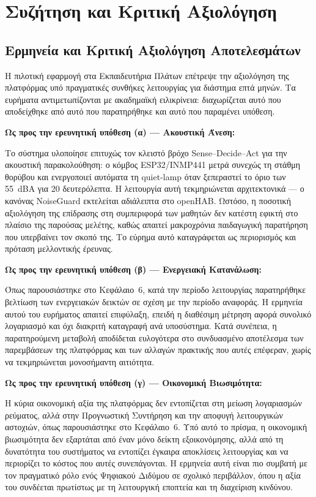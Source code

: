 \chapter{Συζήτηση και Κριτική Αξιολόγηση}

\section{Ερμηνεία και Κριτική Αξιολόγηση Αποτελεσμάτων}
Η πιλοτική εφαρμογή στα Εκπαιδευτήρια Πλάτων επέτρεψε την αξιολόγηση της πλατφόρμας υπό πραγματικές συνθήκες λειτουργίας για διάστημα επτά μηνών. Τα ευρήματα αντιμετωπίζονται με ακαδημαϊκή ειλικρίνεια: διαχωρίζεται αυτό που αποδείχθηκε από αυτό που παρατηρήθηκε και αυτό που παραμένει υπόθεση.

\noindent\textbf{Ως προς την ερευνητική υπόθεση (α) --- Ακουστική Άνεση:}

Το σύστημα υλοποίησε επιτυχώς τον κλειστό βρόχο \textlatin{Sense--Decide--Act} για την ακουστική παρακολούθηση: ο κόμβος \textlatin{ESP32/INMP441} μετρά συνεχώς τη στάθμη θορύβου και ενεργοποιεί αυτόματα τη \textlatin{quiet-lamp} όταν ξεπεραστεί το όριο των 55~\textlatin{dBA} για 20 δευτερόλεπτα. Η λειτουργία αυτή τεκμηριώνεται αρχιτεκτονικά --- ο κανόνας \textlatin{NoiseGuard} εκτελείται αδιάλειπτα στο \textlatin{openHAB}. Ωστόσο, η ποσοτική αξιολόγηση της επίδρασης στη συμπεριφορά των μαθητών δεν κατέστη εφικτή στο πλαίσιο της παρούσας μελέτης, καθώς απαιτεί μακροχρόνια παιδαγωγική παρατήρηση που υπερβαίνει τον σκοπό της. Το εύρημα αυτό καταγράφεται ως περιορισμός και πρόταση μελλοντικής έρευνας.

\noindent\textbf{Ως προς την ερευνητική υπόθεση (β) --- Ενεργειακή Κατανάλωση:}

Όπως παρουσιάστηκε στο Κεφάλαιο~6, κατά την περίοδο λειτουργίας παρατηρήθηκε βελτίωση των ενεργειακών δεικτών σε σχέση με την περίοδο αναφοράς. Η ερμηνεία αυτού του ευρήματος απαιτεί επιφύλαξη, επειδή η διαθέσιμη μέτρηση αφορά συνολικό λογαριασμό και όχι διακριτή καταγραφή ανά υποσύστημα. Κατά συνέπεια, η παρατηρούμενη μεταβολή αποδίδεται ευλογότερα στο συνδυασμένο αποτέλεσμα των παρεμβάσεων της πλατφόρμας και των αλλαγών πρακτικής που αυτές επέφεραν, χωρίς να τεκμηριώνεται μονοσήμαντη αιτιότητα.

\noindent\textbf{Ως προς την ερευνητική υπόθεση (γ) --- Οικονομική Βιωσιμότητα:}

Η κύρια οικονομική αξία της πλατφόρμας δεν εντοπίζεται στη μείωση λογαριασμών ρεύματος, αλλά στην Προγνωστική Συντήρηση και την αποφυγή λειτουργικών αστοχιών, όπως παρουσιάστηκε στο Κεφάλαιο~6. Υπό αυτό το πρίσμα, η οικονομική βιωσιμότητα δεν εξαρτάται από έναν μόνο δείκτη εξοικονόμησης, αλλά από τη δυνατότητα του συστήματος να εντοπίζει έγκαιρα αποκλίσεις λειτουργίας και να περιορίζει το κόστος που αυτές συνεπάγονται. Η ερμηνεία αυτή είναι πιο συμβατή με τον πραγματικό ρόλο ενός Ψηφιακού Διδύμου σε σχολικό περιβάλλον, όπου η αξία του συνδέεται πρωτίστως με τη λειτουργική εποπτεία και τη διαχείριση κινδύνου.

